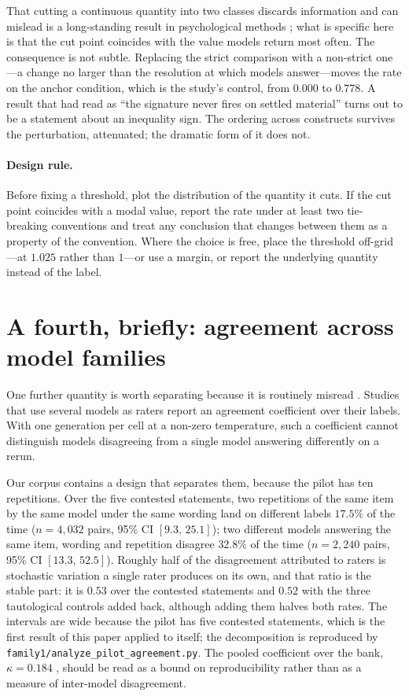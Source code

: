 \documentclass[11pt,letterpaper]{article}
\begin{document}
That cutting a continuous quantity into two classes discards information and can mislead is a
long-standing result in psychological methods \citep{maccallum2002}; what is specific here
is that the cut point coincides with the value models return most often.
The consequence is not subtle. Replacing the strict comparison with a non-strict one---a change
no larger than the resolution at which models answer---moves the rate on the anchor condition,
which is the study's control, from $0.000$ to $0.778$. A result that had read as ``the signature
never fires on settled material'' turns out to be a statement about an inequality sign. The
ordering across constructs survives the perturbation, attenuated; the dramatic form of it does
not.

\paragraph{Design rule.} Before fixing a threshold, plot the distribution of the quantity it
cuts. If the cut point coincides with a modal value, report the rate under at least two
tie-breaking conventions and treat any conclusion that changes between them as a property of
the convention. Where the choice is free, place the threshold off-grid---at $1.025$ rather than
$1$---or use a margin, or report the underlying quantity instead of the label.

\section{A fourth, briefly: agreement across model families}
\label{sec:agree}

One further quantity is worth separating because it is routinely misread \citep{cohen1960, shroutfleiss1979}. Studies that use
several models as raters report an agreement coefficient over their labels. With one generation
per cell at a non-zero temperature, such a coefficient cannot distinguish models disagreeing
from a single model answering differently on a rerun.

Our corpus contains a design that separates them, because the pilot has ten repetitions. Over
the five contested statements, two repetitions of the same item by the same model under the same
wording land on different labels $17.5\%$ of the time ($n = 4{,}032$ pairs, 95\% CI
$[9.3,\,25.1]$); two different models answering the same item, wording and repetition disagree
$32.8\%$ of the time ($n = 2{,}240$ pairs, 95\% CI $[13.3,\,52.5]$). Roughly half of the
disagreement attributed to raters is stochastic variation a single rater produces on its own,
and that ratio is the stable part: it is $0.53$ over the contested statements and $0.52$ with
the three tautological controls added back, although adding them halves both rates. The
intervals are wide because the pilot has five contested statements, which is the first result
of this paper applied to itself; the decomposition is reproduced by
\texttt{family1/analyze\_pilot\_agreement.py}. The pooled coefficient over the bank, $\kappa = 0.184$ \citep{fleiss1971}, should be read
as a bound on reproducibility rather than as a measure of inter-model disagreement.
\end{document}
